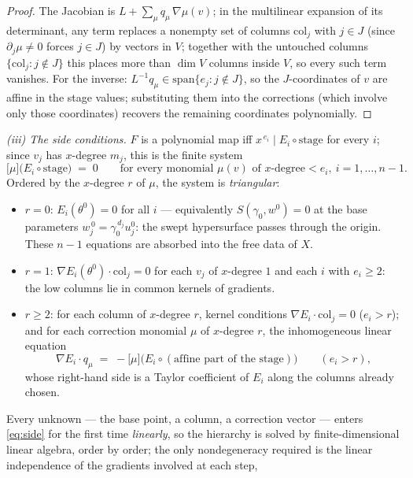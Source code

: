 \documentclass[11pt]{article}
\theoremstyle{plain}
\theoremstyle{definition}
\theoremstyle{remark}
\begin{document}
\begin{proof}
The Jacobian is $L+\sum_\mu q_\mu\,\nabla\mu(v)$; in the multilinear expansion
of its determinant, any term replaces a nonempty set of columns
$\mathrm{col}_j$ with $j\in J$ (since $\partial_j\mu\neq0$ forces $j\in J$) by
vectors in $V$; together with the untouched columns
$\{\mathrm{col}_j:j\notin J\}$ this places more than $\dim V$ columns inside
$V$, so every such term vanishes. For the inverse: $L^{-1}q_\mu\in
\mathrm{span}\{e_j:j\notin J\}$, so the $J$-coordinates of $v$ are affine in
the stage values; substituting them into the corrections (which involve only
those coordinates) recovers the remaining coordinates polynomially.
\end{proof}

\emph{(iii) The side conditions.} $F$ is a polynomial map iff
$x^{\,e_i}\mid E_i\circ\text{stage}$ for every $i$; since $v_j$ has
$x$-degree $m_j$, this is the finite system
\begin{equation}\label{eq:side}
\bigl[\mu\bigr]\bigl(E_i\circ\text{stage}\bigr)\;=\;0
\qquad\text{for every monomial $\mu(v)$ of $x$-degree}<e_i,\ i=1,\dots,n-1 .
\end{equation}
Ordered by the $x$-degree $r$ of $\mu$, the system is \emph{triangular}:
\begin{itemize}
\item $r=0$: $E_i(\theta^0)=0$ for all $i$ --- equivalently $S(\gamma_0,w^0)=0$
at the base parameters $w_j^{\,0}=\gamma_0^{\,d_j}u_j^0$: the swept
hypersurface passes through the origin. These $n-1$ equations are absorbed
into the free data of $X$.
\item $r=1$: $\nabla E_i(\theta^0)\cdot\mathrm{col}_j=0$ for each $v_j$ of
$x$-degree $1$ and each $i$ with $e_i\ge2$: the low columns lie in common
kernels of gradients.
\item $r\ge2$: for each column of $x$-degree $r$, kernel conditions
$\nabla E_i\cdot\mathrm{col}_j=0$ ($e_i>r$); and for each correction monomial
$\mu$ of $x$-degree $r$, the inhomogeneous linear equation
\[
\nabla E_i\cdot q_\mu\;=\;-\bigl[\mu\bigr]
\bigl(E_i\circ(\text{affine part of the stage})\bigr)
\qquad(e_i>r),
\]
whose right-hand side is a Taylor coefficient of $E_i$ along the columns
already chosen.
\end{itemize}
Every unknown --- the base point, a column, a correction vector --- enters
\eqref{eq:side} for the first time \emph{linearly}, so the hierarchy is solved
by finite-dimensional linear algebra, order by order; the only nondegeneracy
required is the linear independence of the gradients involved at each step,
\end{document}
